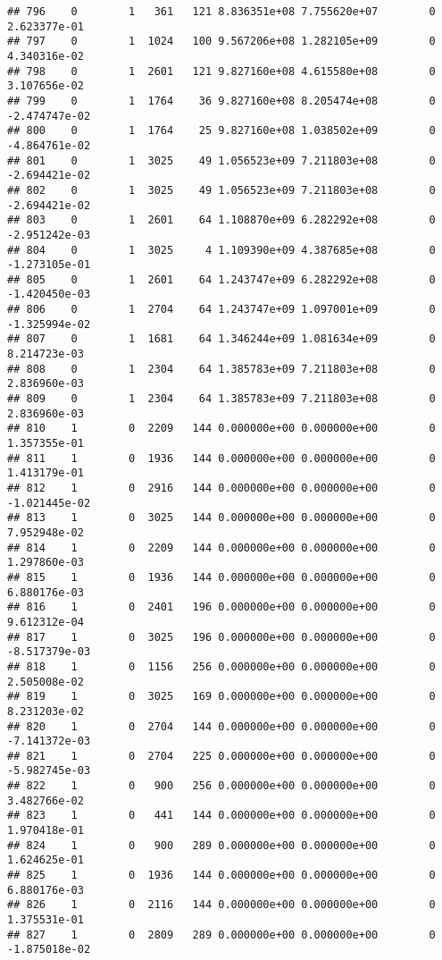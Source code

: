 \documentclass[
]{article}
\begin{document}
\begin{enumerate}
\begin{verbatim}
## 796    0        1   361   121 8.836351e+08 7.755620e+07        0  2.623377e-01
## 797    0        1  1024   100 9.567206e+08 1.282105e+09        0  4.340316e-02
## 798    0        1  2601   121 9.827160e+08 4.615580e+08        0  3.107656e-02
## 799    0        1  1764    36 9.827160e+08 8.205474e+08        0 -2.474747e-02
## 800    0        1  1764    25 9.827160e+08 1.038502e+09        0 -4.864761e-02
## 801    0        1  3025    49 1.056523e+09 7.211803e+08        0 -2.694421e-02
## 802    0        1  3025    49 1.056523e+09 7.211803e+08        0 -2.694421e-02
## 803    0        1  2601    64 1.108870e+09 6.282292e+08        0 -2.951242e-03
## 804    0        1  3025     4 1.109390e+09 4.387685e+08        0 -1.273105e-01
## 805    0        1  2601    64 1.243747e+09 6.282292e+08        0 -1.420450e-03
## 806    0        1  2704    64 1.243747e+09 1.097001e+09        0 -1.325994e-02
## 807    0        1  1681    64 1.346244e+09 1.081634e+09        0  8.214723e-03
## 808    0        1  2304    64 1.385783e+09 7.211803e+08        0  2.836960e-03
## 809    0        1  2304    64 1.385783e+09 7.211803e+08        0  2.836960e-03
## 810    1        0  2209   144 0.000000e+00 0.000000e+00        0  1.357355e-01
## 811    1        0  1936   144 0.000000e+00 0.000000e+00        0  1.413179e-01
## 812    1        0  2916   144 0.000000e+00 0.000000e+00        0 -1.021445e-02
## 813    1        0  3025   144 0.000000e+00 0.000000e+00        0  7.952948e-02
## 814    1        0  2209   144 0.000000e+00 0.000000e+00        0  1.297860e-03
## 815    1        0  1936   144 0.000000e+00 0.000000e+00        0  6.880176e-03
## 816    1        0  2401   196 0.000000e+00 0.000000e+00        0  9.612312e-04
## 817    1        0  3025   196 0.000000e+00 0.000000e+00        0 -8.517379e-03
## 818    1        0  1156   256 0.000000e+00 0.000000e+00        0  2.505008e-02
## 819    1        0  3025   169 0.000000e+00 0.000000e+00        0  8.231203e-02
## 820    1        0  2704   144 0.000000e+00 0.000000e+00        0 -7.141372e-03
## 821    1        0  2704   225 0.000000e+00 0.000000e+00        0 -5.982745e-03
## 822    1        0   900   256 0.000000e+00 0.000000e+00        0  3.482766e-02
## 823    1        0   441   144 0.000000e+00 0.000000e+00        0  1.970418e-01
## 824    1        0   900   289 0.000000e+00 0.000000e+00        0  1.624625e-01
## 825    1        0  1936   144 0.000000e+00 0.000000e+00        0  6.880176e-03
## 826    1        0  2116   144 0.000000e+00 0.000000e+00        0  1.375531e-01
## 827    1        0  2809   289 0.000000e+00 0.000000e+00        0 -1.875018e-02

\end{verbatim}
\end{enumerate}
\end{document}
